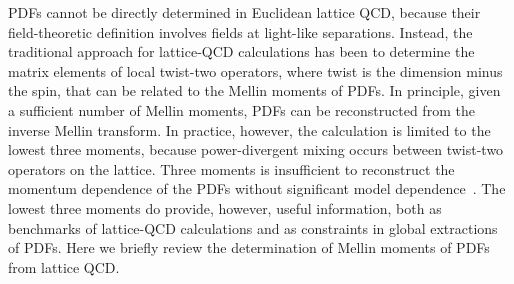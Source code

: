 PDFs cannot be directly determined in Euclidean lattice QCD, because their 
field-theoretic definition involves fields at light-like separations. Instead, 
the traditional approach for lattice-QCD calculations has been to determine the matrix elements of local twist-two operators, where twist is the dimension minus the spin, that can be related to the Mellin moments of PDFs. In principle, given a sufficient number of Mellin moments, PDFs can be reconstructed from the inverse Mellin transform. In practice, however, the calculation is limited to the lowest three moments, because power-divergent mixing occurs between twist-two operators on the lattice. Three moments is insufficient to reconstruct the momentum dependence of the PDFs without significant model dependence~\cite{Detmold:2003rq}. The lowest three moments do provide, however, useful information, both as benchmarks of lattice-QCD calculations and as constraints in global extractions of PDFs. Here we briefly review the determination of Mellin moments of PDFs from lattice QCD. 

